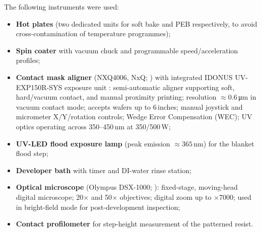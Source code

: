 The following instruments were used:
\begin{itemize}
  \item \textbf{Hot plates} (two dedicated units for soft bake and PEB
    respectively, to avoid cross-contamination of temperature programmes);
  \item \textbf{Spin coater} with vacuum chuck and programmable
    speed/acceleration profiles;
  \item \textbf{Contact mask aligner} (NXQ4006, NxQ; \cite{NXQ4006})
    with integrated IDONUS UV-EXP150R-SYS exposure unit
    \cite{IDONUS_UV}: semi-automatic aligner supporting soft,
    hard/vacuum contact, and manual proximity printing; resolution
    $\approx$0.6\,\si{\micro\meter} in vacuum contact mode; accepts
    wafers up to 6\,inches; manual joystick and micrometer
    X/Y/rotation controls; Wedge Error Compensation (WEC); UV optics
    operating across 350--450\,nm at 350/500\,W;
  \item \textbf{UV-LED flood exposure lamp} (peak emission $\approx 365$\,nm)
    for the blanket flood step;
  \item \textbf{Developer bath} with timer and DI-water rinse station;
  \item \textbf{Optical microscope} (Olympus DSX-1000;
    \cite{OlympusDSX1000}): fixed-stage, moving-head digital
    microscope; 20$\times$ and 50$\times$ objectives; digital zoom up
    to $\times$7000; used in bright-field mode for post-development inspection;
  \item \textbf{Contact profilometer} for step-height measurement of the
    patterned resist.
\end{itemize}
